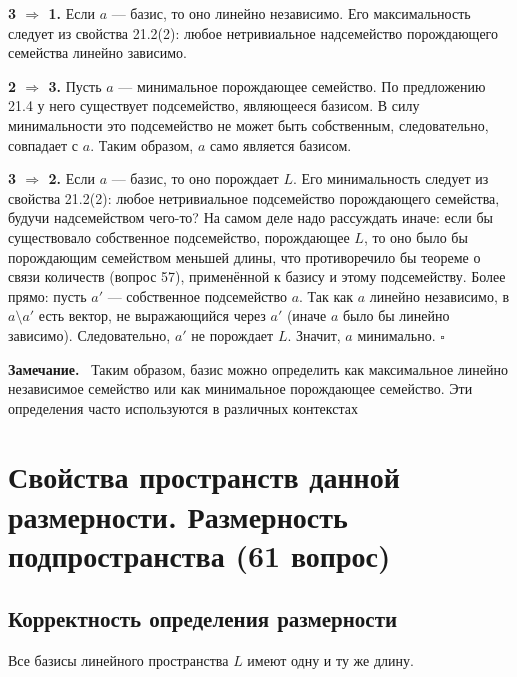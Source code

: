 \documentclass[a4paper,12pt]{article}
\newcommand{\myremark}{\textbf{Замечание.}\ }
\theoremstyle{definition}
\theoremstyle{plain}
\theoremstyle{remark}
\begin{document}
	\textbf{3 \(\Rightarrow\) 1.} Если \( a \) — базис, то оно линейно независимо. Его максимальность следует из свойства 21.2(2): любое нетривиальное надсемейство порождающего семейства линейно зависимо.
	
	\textbf{2 \(\Rightarrow\) 3.} Пусть \( a \) — минимальное порождающее семейство. По предложению 21.4 у него существует подсемейство, являющееся базисом. В силу минимальности это подсемейство не может быть собственным, следовательно, совпадает с \( a \). Таким образом, \( a \) само является базисом.
	
	\textbf{3 \(\Rightarrow\) 2.} Если \( a \) — базис, то оно порождает \( L \). Его минимальность следует из свойства 21.2(2): любое нетривиальное подсемейство порождающего семейства, будучи надсемейством чего-то? На самом деле надо рассуждать иначе: если бы существовало собственное подсемейство, порождающее \( L \), то оно было бы порождающим семейством меньшей длины, что противоречило бы теореме о связи количеств (вопрос 57), применённой к базису и этому подсемейству. Более прямо: пусть \( a' \) — собственное подсемейство \( a \). Так как \( a \) линейно независимо, в \( a \setminus a' \) есть вектор, не выражающийся через \( a' \) (иначе \( a \) было бы линейно зависимо). Следовательно, \( a' \) не порождает \( L \). Значит, \( a \) минимально. \hfill \(\square\)
	
	\myremark
	Таким образом, базис можно определить как максимальное линейно независимое семейство или как минимальное порождающее семейство. Эти определения часто используются в различных контекстах
	
	
	
	
	
	\newpage
	\section{Свойства пространств данной размерности. Размерность подпространства (61 вопрос)}
	
	\subsection{Корректность определения размерности}
	
	\begin{tcolorbox}[colback=blue!5, colframe=blue!40!black, title=Предложение 22.1]
		Все базисы линейного пространства \( L \) имеют одну и ту же длину.
	\end{tcolorbox}
	
\end{document}
